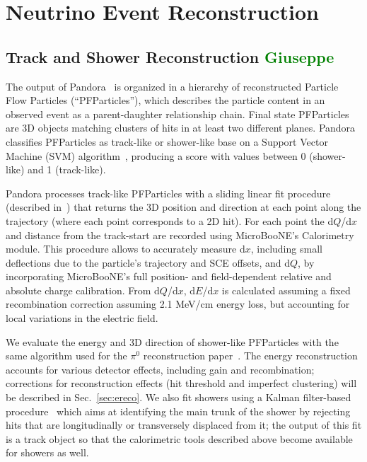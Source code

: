 \documentclass[a4paper]{article}
\begin{document}
\newpage

\section{Neutrino Event Reconstruction}

\subsection{Track and Shower Reconstruction \textcolor{green}{Giuseppe}}
\label{sec:tkshreco}
The output of Pandora~\cite{bib:pandoraub} is organized in a hierarchy of reconstructed Particle Flow Particles (``PFParticles''), which describes the particle content in an observed event as a parent-daughter relationship chain. Final state PFParticles are 3D objects matching clusters of hits in at least two different planes.
Pandora classifies PFParticles as track-like or shower-like base on a Support Vector Machine (SVM) algorithm~\cite{bib:tkshsvm}, producing a score with values between 0 (shower-like) and 1 (track-like).

Pandora processes track-like PFParticles with a sliding linear fit procedure (described in~\cite{bib:pandoraub}) that returns the 3D position and direction at each point along the trajectory (where each point corresponds to a 2D hit). For each point the d$Q$/d$x$ and distance from the track-start are recorded using MicroBooNE's Calorimetry module. This procedure allows to accurately measure d$x$, including small deflections due to the particle's trajectory and SCE offsets, and d$Q$, by incorporating MicroBooNE's full position- and field-dependent relative and absolute charge calibration. From d$Q$/d$x$, d$E$/d$x$ is calculated assuming a fixed recombination correction assuming 2.1 MeV/cm energy loss, but accounting for local variations in the electric field.

We evaluate the energy and 3D direction of shower-like PFParticles with the same algorithm used for the $\pi^0$ reconstruction paper~\cite{bib:pi0reco}. The energy reconstruction accounts for various detector effects, including gain and recombination; corrections for reconstruction effects (hit threshold and imperfect clustering) will be described in Sec.~\ref{sec:ereco}. We also fit showers using a Kalman filter-based procedure~\cite{bib:shrtrackfitter} which aims at identifying the main trunk of the shower by rejecting hits that are longitudinally or transversely displaced from it; the output of this fit is a track object so that the calorimetric tools described above become available for showers as well.
\end{document}
